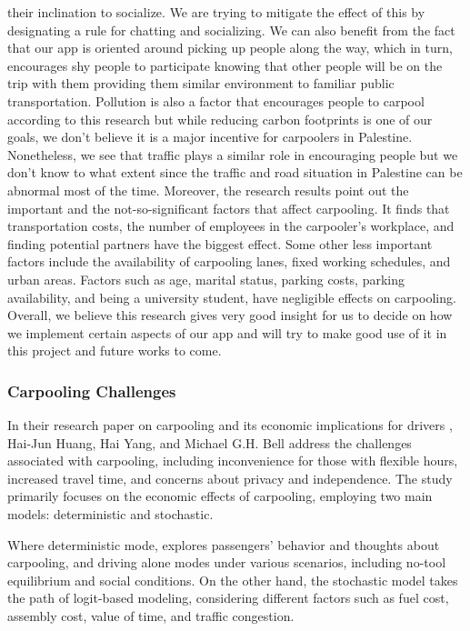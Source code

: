 \documentclass[a4paper, 12pt]{report} %
\begin{document}
their inclination to socialize. We are trying to mitigate the effect of this by designating a rule for chatting and socializing. We can also benefit from the fact that our app is oriented around picking up people along the way, which in turn, encourages shy people to participate knowing that other people will be on the trip with them providing them similar environment to familiar public transportation. Pollution is also a factor that encourages people to carpool according to this research but while reducing carbon footprints is one of our goals, we don't believe it is a major incentive for carpoolers in Palestine. Nonetheless, we see that traffic plays a similar role in encouraging people but we don't know to what extent since the traffic and road situation in Palestine can be abnormal most of the time. Moreover, the research results point out the important and the not-so-significant factors that affect carpooling. It finds that transportation costs, the number of employees in the carpooler's workplace, and finding potential partners have the biggest effect. Some other less important factors include the availability of carpooling lanes, fixed working schedules, and urban areas. Factors such as age, marital status, parking costs, parking availability, and being a university student,  have negligible effects on carpooling. \cite{soton381789} Overall, we believe this research gives very good insight for us to decide on how we implement certain aspects of our app and will try to make good use of it in this project and future works to come.

            \subsubsection{Carpooling Challenges}
                In their research paper on carpooling and its economic implications for drivers \cite{carpool_challenge}, Hai-Jun Huang, Hai Yang, and Michael G.H. Bell address the challenges associated with carpooling, including inconvenience for those with flexible hours, increased travel time, and concerns about privacy and independence. The study primarily focuses on the economic effects of carpooling, employing two main models: deterministic and stochastic.
                
                Where deterministic mode, explores passengers’ behavior and thoughts about carpooling, and driving alone modes under various scenarios, including no-tool equilibrium and social conditions. On the other hand, the stochastic model takes the path of logit-based modeling, considering different factors such as fuel cost, assembly cost, value of time, and traffic congestion.
                
\end{document}
